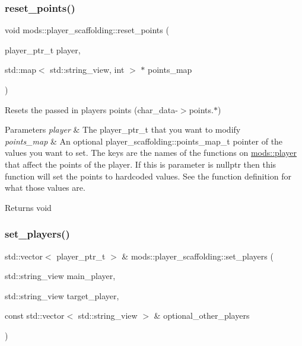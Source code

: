 \subsubsection{\texorpdfstring{reset\+\_\+points()}{reset\_points()}}
{\footnotesize\ttfamily void mods\+::player\+\_\+scaffolding\+::reset\+\_\+points (\begin{DoxyParamCaption}\item[{player\+\_\+ptr\+\_\+t}]{player,  }\item[{std\+::map$<$ std\+::string\+\_\+view, int $>$ $\ast$}]{points\+\_\+map }\end{DoxyParamCaption})}

Resets the passed in player\textquotesingle{}s points (char\+\_\+data-\/$>$points.$\ast$)


\begin{DoxyParams}{Parameters}
{\em player} & The player\+\_\+ptr\+\_\+t that you want to modify \\
\hline
{\em points\+\_\+map} & An optional player\+\_\+scaffolding\+::points\+\_\+map\+\_\+t pointer of the values you want to set. The keys are the names of the functions on \hyperlink{classmods_1_1player}{mods\+::player} that affect the points of the player. If this is parameter is nullptr then this function will set the points to hardcoded values. See the function definition for what those values are. \\
\hline
\end{DoxyParams}
\begin{DoxyReturn}{Returns}
void 
\end{DoxyReturn}
\mbox{\label{structmods_1_1player__scaffolding_a4c8911028cfc28aea79fb8cfe29b7f78}} 
\subsubsection{\texorpdfstring{set\+\_\+players()}{set\_players()}\hspace{0.1cm}{\footnotesize\ttfamily [1/3]}}
{\footnotesize\ttfamily std\+::vector$<$ player\+\_\+ptr\+\_\+t $>$ \& mods\+::player\+\_\+scaffolding\+::set\+\_\+players (\begin{DoxyParamCaption}\item[{std\+::string\+\_\+view}]{main\+\_\+player,  }\item[{std\+::string\+\_\+view}]{target\+\_\+player,  }\item[{const std\+::vector$<$ std\+::string\+\_\+view $>$ \&}]{optional\+\_\+other\+\_\+players }\end{DoxyParamCaption})}

